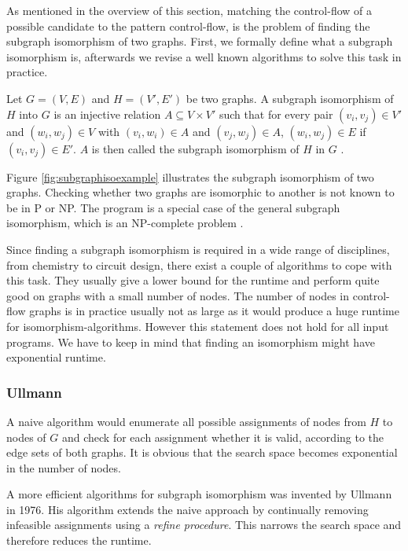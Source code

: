 As mentioned in the overview of this section, matching the control-flow of a possible candidate to the pattern control-flow, is the problem of finding the subgraph isomorphism of two graphs. First, we formally define what a subgraph isomorphism is, afterwards we revise a well known algorithms to solve this task in practice.

\begin{defn}
\label{def:subgraph_iso}
Let $G=(V, E)$ and $H=(V', E')$ be two graphs. A subgraph isomorphism of $H$ into $G$ is an injective relation $A\subseteq V \times V'$ such that for every pair $(v_i, v_j) \in V'$ and $(w_i, w_j) \in V$ with $(v_i, w_i) \in A$ and $(v_j, w_j) \in A$, $(w_i, w_j) \in E$ if $(v_i, v_j) \in E'$. $A$ is then called the subgraph isomorphism of $H$ in $G$ \cite{valiente2002algorithms}.
\end{defn}

Figure \ref{fig:subgraphisoexample} illustrates the subgraph isomorphism of two graphs. Checking whether two graphs are isomorphic to another is not known to be in P or NP. The program is a special case of the general subgraph isomorphism, which is an NP-complete problem \cite{wegener2005complexity}.



Since finding a subgraph isomorphism is required in a wide range of disciplines, from chemistry to circuit design, there exist a couple of algorithms to cope with this task. They usually give a lower bound for the runtime and perform quite good on graphs with a small number of nodes. The number of nodes in control-flow graphs is in practice usually not as large as it would produce a huge runtime for isomorphism-algorithms. However this statement does not hold for all input programs. We have to keep in mind that finding an isomorphism might have exponential runtime.

\subsubsection{Ullmann}


A naive algorithm would enumerate all possible assignments of nodes from $H$ to nodes of $G$ and check for each assignment whether it is valid, according to the edge sets of both graphs. It is obvious that the search space becomes exponential in the number of nodes.

A more efficient algorithms for subgraph isomorphism was invented by Ullmann \cite{Ullmann:1976} in 1976. His algorithm extends the naive approach by continually removing infeasible assignments using a \textit{refine procedure}. This narrows the search space and therefore reduces the runtime.

